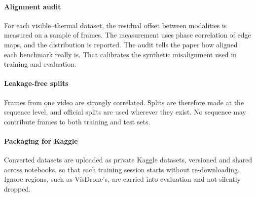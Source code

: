 \paragraph{Alignment audit}
\label{sec:audit}
For each visible--thermal dataset, the residual offset between modalities is
measured on a sample of frames. The measurement uses phase correlation of
edge maps, and the distribution is reported. The audit tells the paper how
aligned each benchmark really is. That calibrates the synthetic misalignment
used in training and evaluation.

\paragraph{Leakage-free splits}
Frames from one video are strongly correlated. Splits are therefore made at
the sequence level, and official splits are used wherever they exist. No
sequence may contribute frames to both training and test sets.

\paragraph{Packaging for Kaggle}
Converted datasets are uploaded as private Kaggle datasets, versioned and
shared across notebooks, so that each training session starts without
re-downloading. Ignore regions, such as VisDrone's, are carried into
evaluation and not silently dropped.


